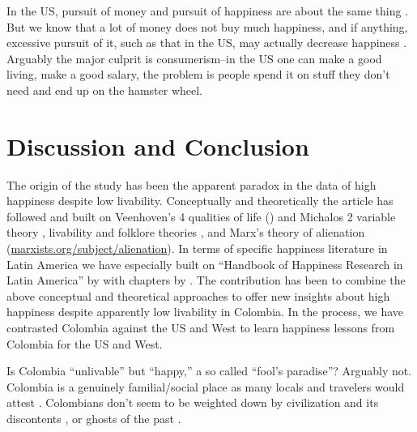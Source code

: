 \documentclass[10pt, letterpaper]{article}
\begin{document}
\begin{spacing}{2}
In the US, pursuit of money and pursuit of happiness are about the same thing
\citep{easterlin73}.
But we know that a lot of money does not buy much happiness, and if anything, excessive pursuit of it, such as that in the US, may actually decrease happiness \citep{kasser16,dittmar14,brown05,kasser13,schmuck00,kasser93,leonard10}.
Arguably the major culprit is consumerism--in the US one can
make a good living, make a good salary, the problem is people spend it on stuff
they don't need and end up on the hamster wheel. %


 
\section{Discussion and Conclusion}

The origin of the study has been the apparent paradox in the data of
high happiness despite low livability. Conceptually and theoretically the
article has followed and built on Veenhoven's 4 qualities of life
(\citeyear{veenhoven00b}) and Michalos 2 variable
theory \citep{michalos14B}, livability and folklore theories
\citep{veenhoven95,veenhoven14b}, and Marx's theory of alienation 
 (\url{marxists.org/subject/alienation}). {In terms of specific happiness literature in Latin America we have especially
built on ``Handbook of Happiness Research in Latin America'' by \citet{rojas15}  
with chapters by \citet{hurtado2016socioeconomic,velasquez2016importance,yamamoto16}.} The
contribution has been to combine the above conceptual
and theoretical approaches to offer new insights about high happiness despite
apparently low livability in Colombia. In the process, we have contrasted
Colombia against the US and West to learn happiness lessons from Colombia for the
US and West. 


Is Colombia ``unlivable'' but ``happy,'' a so called ``fool's paradise''?
 Arguably not.
 Colombia is a genuinely %
 familial/social  
place  as many locals and travelers would attest
\citep[e.g.,][]{roosHUFF19mar26,wallaceBBC17mar30,motodreamer}. %
 Colombians don't seem to be weighted down by civilization and its discontents
\citep{freud30}, or ghosts of the past \citep{pile05B,pile05}.



\end{spacing}
\end{document}
